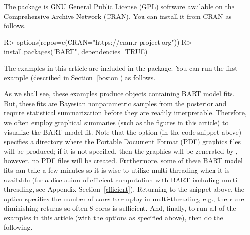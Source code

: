 \documentclass[article]{jss}
\begin{document}
The  package \citep{McCuSpar18} is GNU General Public
License (GPL) software available on the Comprehensive  Archive
Network (CRAN).  You can install it from CRAN as follows.
\begin{Sinput}
R> options(repos=c(CRAN="https://cran.r-project.org"))
R> install.packages("BART", dependencies=TRUE)
\end{Sinput}
The examples in this article are included in the package.  You can run
the first example (described in Section~\ref{boston}) as follows.
As we shall see, these examples produce  objects
containing BART model fits.  But, these fits are Bayesian
nonparametric samples from the posterior and require statistical
summarization before they are readily interpretable.  Therefore, we
often employ graphical summaries (such as the figures in this article)
to visualize the BART model fit.  Note that the  option
(in the code snippet above) specifies a directory where the Portable
Document Format (PDF) graphics files will be produced; if it is not
specified, then the graphics will be generated by ,
however, no PDF files will be created.  Furthermore, some of these
BART model fits can take a few minutes so it is wise to utilize
multi-threading when it is available (for a discussion of efficient
computation with BART including multi-threading, see Appendix
Section~\ref{efficient}).  Returning to the snippet above, the option
 specifies the number of cores to employ in
multi-threading, e.g., there are diminishing returns so often 8
cores is sufficient.  And, finally, to run all of the examples in this
article (with the options as specified above), then do the following.


\end{document}

